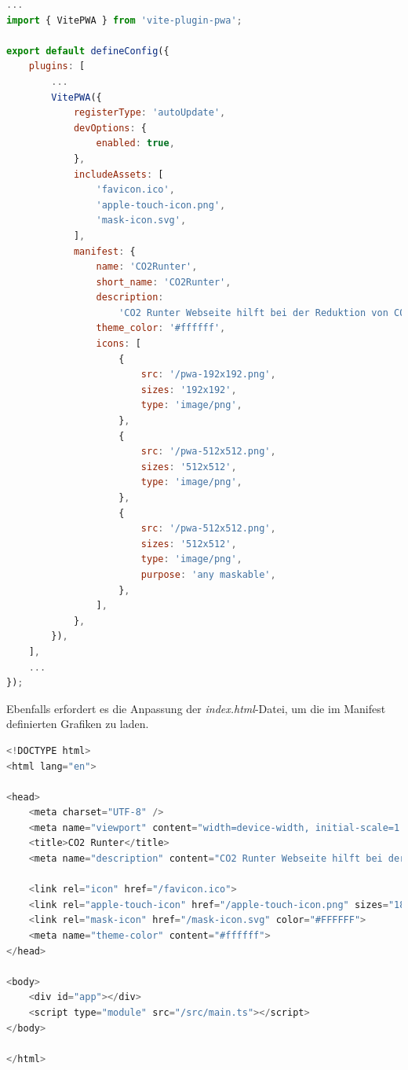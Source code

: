 \begin{lstlisting}[language={JavaScript}, caption={Angepasste Vite Konfiguration für PWA}]
...
import { VitePWA } from 'vite-plugin-pwa';

export default defineConfig({
    plugins: [
        ...
        VitePWA({
            registerType: 'autoUpdate',
            devOptions: {
                enabled: true,
            },
            includeAssets: [
                'favicon.ico',
                'apple-touch-icon.png',
                'mask-icon.svg',
            ],
            manifest: {
                name: 'CO2Runter',
                short_name: 'CO2Runter',
                description:
                    'CO2 Runter Webseite hilft bei der Reduktion von CO2',
                theme_color: '#ffffff',
                icons: [
                    {
                        src: '/pwa-192x192.png',
                        sizes: '192x192',
                        type: 'image/png',
                    },
                    {
                        src: '/pwa-512x512.png',
                        sizes: '512x512',
                        type: 'image/png',
                    },
                    {
                        src: '/pwa-512x512.png',
                        sizes: '512x512',
                        type: 'image/png',
                        purpose: 'any maskable',
                    },
                ],
            },
        }),
    ],
    ...
});
\end{lstlisting}

Ebenfalls erfordert es die Anpassung der \textit{index.html}-Datei, um die im Manifest definierten Grafiken zu laden.

\begin{lstlisting}[language={JavaScript}, caption={Anpassungen an der index.html Datei}]
<!DOCTYPE html>
<html lang="en">

<head>
    <meta charset="UTF-8" />
    <meta name="viewport" content="width=device-width, initial-scale=1.0" />
    <title>CO2 Runter</title>
    <meta name="description" content="CO2 Runter Webseite hilft bei der Reduktion von CO2">

    <link rel="icon" href="/favicon.ico">
    <link rel="apple-touch-icon" href="/apple-touch-icon.png" sizes="180x180">
    <link rel="mask-icon" href="/mask-icon.svg" color="#FFFFFF">
    <meta name="theme-color" content="#ffffff">
</head>

<body>
    <div id="app"></div>
    <script type="module" src="/src/main.ts"></script>
</body>

</html>
\end{lstlisting}

